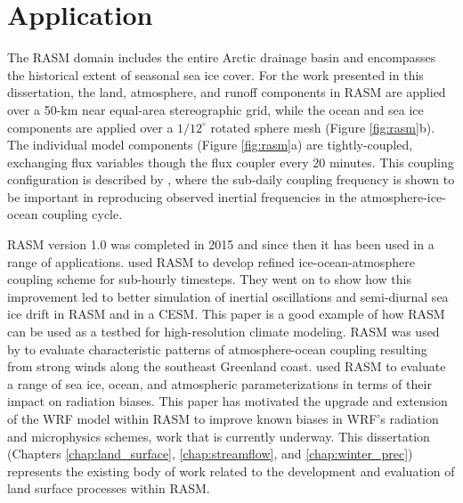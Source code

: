 \section{Application}

The RASM domain includes the entire Arctic drainage basin and encompasses the historical extent of seasonal sea ice cover.
For the work presented in this dissertation, the land, atmosphere, and runoff components in RASM are applied over a 50-km near equal-area stereographic grid, while the ocean and sea ice components are applied over a $1/12^{\circ}$ rotated sphere mesh (Figure \ref{fig:rasm}b).
The individual model components (Figure \ref{fig:rasm}a) are tightly-coupled, exchanging flux variables though the flux coupler every 20 minutes.
This coupling configuration is described by \citet{Roberts_2015a}, where the sub-daily coupling frequency is shown to be important in reproducing observed inertial frequencies in the atmosphere-ice-ocean coupling cycle.

RASM version 1.0 was completed in 2015 and since then it has been used in a range of applications.
\citet{Roberts_2015a} used RASM to develop refined ice-ocean-atmosphere coupling scheme for sub-hourly timesteps.
They went on to show how this improvement led to better simulation of inertial oscillations and semi-diurnal sea ice drift in RASM and in a CESM.
This paper is a good example of how RASM can be used as a testbed for high-resolution climate modeling.
RASM was used by \citet{DuVivier_2016} to evaluate characteristic patterns of atmosphere-ocean coupling resulting from strong winds along the southeast Greenland coast.
\citet{Cassano_2016} used RASM to evaluate a range of sea ice, ocean, and atmospheric parameterizations in terms of their impact on radiation biases.
This paper has motivated the upgrade and extension of the WRF model within RASM to improve known biases in WRF's radiation and microphysics schemes, work that is currently underway.
This dissertation (Chapters \ref{chap:land_surface}, \ref{chap:streamflow}, and \ref{chap:winter_prec}) represents the existing body of work related to the development and evaluation of land surface processes within RASM.
